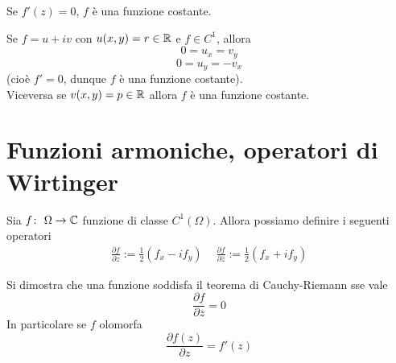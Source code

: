 \begin{corollary}
	Se $f'(z) = 0$, $f$ è una funzione costante.
\end{corollary}

\begin{corollary}
	Se $f = u + iv$ con $u(x,y) = r \in \mathbb{R}$ e $f \in C^1$, allora 
	$$0 = u_x = v_y$$
	$$0 = u_y = -v_x$$
	 (cioè $f' = 0$, dunque $f$ è una funzione costante). \\ Viceversa se $v(x,y) = p \in \mathbb{R}$ allora $f$ è una funzione costante.   
\end{corollary}

\section{Funzioni armoniche, operatori di Wirtinger}

\begin{definition}
	Sia $f \colon\ \Omega \rightarrow \mathbb{C}$ funzione di classe $C^1(\Omega)$. Allora possiamo definire i seguenti operatori
	\begin{equation}
	\begin{aligned}
		\frac{\partial f}{\partial z} := \frac{1}{2}(f_x - if_y) \quad\ \frac{\partial f}{\partial \overline{z}} := \frac{1}{2}(f_x + if_y)
	\end{aligned}
	\end{equation}
\end{definition}

\begin{remark}
	Si dimostra che una funzione soddisfa il teorema di Cauchy-Riemann sse vale 
	\begin{equation*}
		\frac{\partial f}{\partial \overline{z}} = 0
	\end{equation*}
	In particolare se $f$ olomorfa 
	\begin{equation*}
		\frac{\partial f(z)}{\partial z} = f'(z) 
	\end{equation*}
\end{remark}

